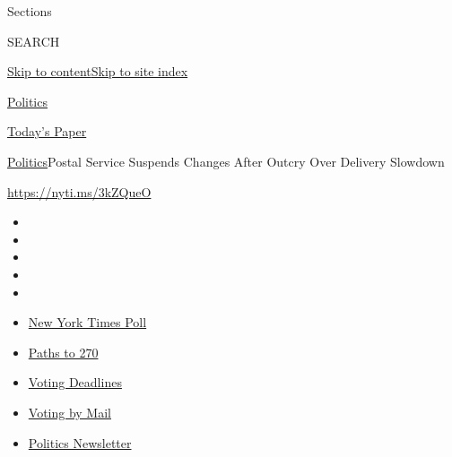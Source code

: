 Sections

SEARCH

\protect\hyperlink{site-content}{Skip to
content}\protect\hyperlink{site-index}{Skip to site index}

\href{https://www.nytimes3xbfgragh.onion/section/politics}{Politics}

\href{https://myaccount.nytimes3xbfgragh.onion/auth/login?response_type=cookie\&client_id=vi}{}

\href{https://www.nytimes3xbfgragh.onion/section/todayspaper}{Today's
Paper}

\href{/section/politics}{Politics}\textbar{}Postal Service Suspends
Changes After Outcry Over Delivery Slowdown

\url{https://nyti.ms/3kZQueO}

\begin{itemize}
\item
\item
\item
\item
\item
\end{itemize}

\begin{itemize}
\item
  \href{https://www.nytimes3xbfgragh.onion/2020/09/12/us/politics/biden-trump-poll-wisconsin-minnesota.html?action=click\&pgtype=Article\&state=default\&region=TOP_BANNER\&context=storylines_menu}{New
  York Times Poll}
\item
  \href{https://www.nytimes3xbfgragh.onion/interactive/2020/us/elections/election-states-biden-trump.html?action=click\&pgtype=Article\&state=default\&region=TOP_BANNER\&context=storylines_menu}{Paths
  to 270}
\item
  \href{https://www.nytimes3xbfgragh.onion/interactive/2019/us/elections/2020-presidential-election-calendar.html?action=click\&pgtype=Article\&state=default\&region=TOP_BANNER\&context=storylines_menu}{Voting
  Deadlines}
\item
  \href{https://www.nytimes3xbfgragh.onion/interactive/2020/08/31/us/politics/vote-by-mail-deadlines.html?action=click\&pgtype=Article\&state=default\&region=TOP_BANNER\&context=storylines_menu}{Voting
  by Mail}
\item
  \href{https://www.nytimes3xbfgragh.onion/newsletters/politics?action=click\&pgtype=Article\&state=default\&region=TOP_BANNER\&context=storylines_menu}{Politics
  Newsletter}
\end{itemize}

